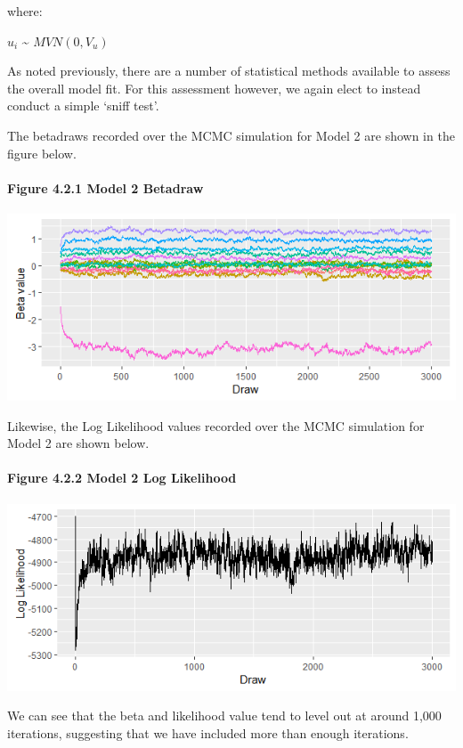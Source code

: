 \documentclass[]{article}
\let\oldparagraph\paragraph
\renewcommand{\paragraph}[1]{\oldparagraph{#1}\mbox{}}
\begin{document}
where:

\(u_{i}\) \textasciitilde{} \(MVN\left(0,V_{u}\right)\)

As noted previously, there are a number of statistical methods available
to assess the overall model fit. For this assessment however, we again
elect to instead conduct a simple `sniff test'.

The betadraws recorded over the MCMC simulation for Model 2 are shown in
the figure below.

\paragraph{Figure 4.2.1 Model 2
Betadraw}\label{figure-4.2.1-model-2-betadraw}

\includegraphics{images/model2_betadraw.png}

Likewise, the Log Likelihood values recorded over the MCMC simulation
for Model 2 are shown below.

\paragraph{Figure 4.2.2 Model 2 Log
Likelihood}\label{figure-4.2.2-model-2-log-likelihood}

\includegraphics{images/model2_loglike.png}

We can see that the beta and likelihood value tend to level out at
around 1,000 iterations, suggesting that we have included more than
enough iterations.
\end{document}
